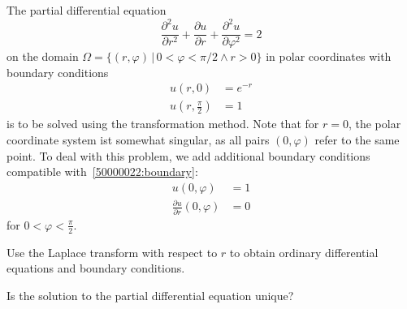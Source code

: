 The partial differential equation
\begin{equation}
\frac{\partial^2 u}{\partial r^2}
+
\frac{\partial u}{\partial r}
+
\frac{\partial^2 u}{\partial \varphi^2}
=
2
\label{50000022:eqn}
\end{equation}
on the domain $\Omega = \{ (r,\varphi)\,|\,0<\varphi<\pi/2\wedge r>0\}$
in polar coordinates with boundary conditions
\begin{align}
u(r,0)                       &= e^{-r}
\label{50000022:bottom}
\\
u(r,{\textstyle\frac{\pi}2}) &= 1 
\label{50000022:boundary}
\end{align}
is to be solved using the transformation method.
Note that for $r=0$, the polar coordinate system ist somewhat singular,
as all pairs $(0,\varphi)$ refer to the same point.
To deal with this problem, we add additional boundary conditions
compatible with~\eqref{50000022:boundary}:
\begin{equation}
\begin{aligned}
u(0,\varphi) &= 1
\\
\frac{\partial u}{\partial r}(0,\varphi) &= 0
\end{aligned}
\label{50000022:additional}
\end{equation}
for $0<\varphi<\frac{\pi}2$.

\begin{teilaufgaben}
\item
Use the Laplace transform with respect to $r$ to obtain ordinary differential
equations and boundary conditions.
\item
Is the solution to the partial differential equation unique?
\end{teilaufgaben}


